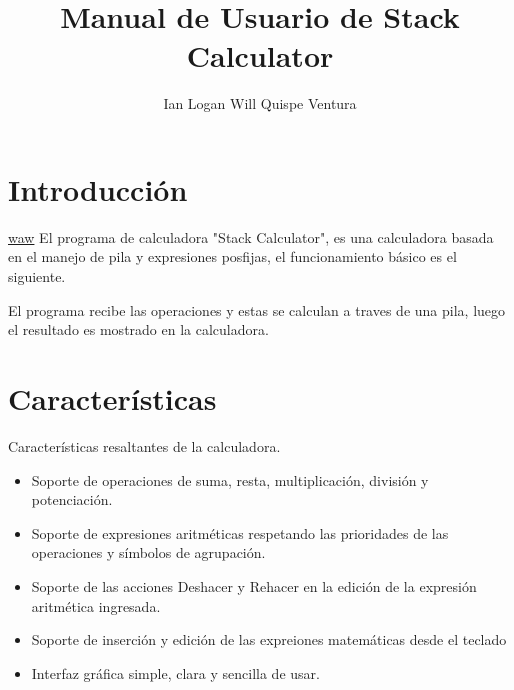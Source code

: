 \documentclass[a4paper,12pt]{article}
\title{Manual de Usuario de Stack Calculator}
\author{Ian Logan Will Quispe Ventura}
\date{ }
\begin{document}
\maketitle

\section{Introducción}
\underline{waw}
El programa de calculadora "Stack Calculator", es una calculadora basada en el manejo de pila y expresiones posfijas, el funcionamiento básico es el siguiente.

El programa recibe las operaciones y estas se calculan a traves de una pila, luego el resultado es mostrado en la calculadora. 

\section{Características}
Características resaltantes de la calculadora.
\begin{itemize}
    \item Soporte de operaciones de suma, resta, multiplicación, división y potenciación.
    \item Soporte de expresiones aritméticas respetando las prioridades de las operaciones y símbolos de agrupación.
    \item Soporte de las acciones Deshacer y Rehacer en la edición de la expresión aritmética ingresada.
    \item Soporte de inserción y edición de las expreiones matemáticas desde el teclado 
    \item Interfaz gráfica simple, clara y sencilla de usar.
\end{itemize}
\end{document}
